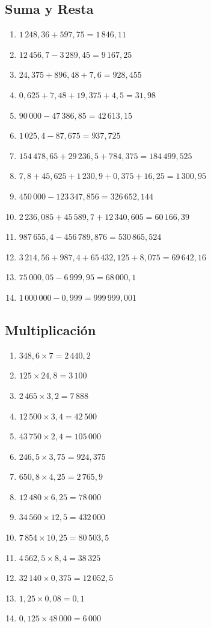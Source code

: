\documentclass[12pt, letterpaper]{article}
\begin{document}
  \subsection*{Suma y Resta}
  \begin{enumerate}[leftmargin=*, label=\textbf{\arabic*.}]
    \item $1\,248{,}36 + 597{,}75 = 1\,846{,}11$
    \item $12\,456{,}7 - 3\,289{,}45 = 9\,167{,}25$
    \item $24{,}375 + 896{,}48 + 7{,}6 = 928{,}455$
    \item $0{,}625 + 7{,}48 + 19{,}375 + 4{,}5 = 31{,}98$
    \item $90\,000 - 47\,386{,}85 = 42\,613{,}15$
    \item $1\,025{,}4 - 87{,}675 = 937{,}725$
    \item $154\,478{,}65 + 29\,236{,}5 + 784{,}375 = 184\,499{,}525$
    \item $7{,}8 + 45{,}625 + 1\,230{,}9 + 0{,}375 + 16{,}25 = 1\,300{,}95$
    \item $450\,000 - 123\,347{,}856 = 326\,652{,}144$
    \item $2\,236{,}085 + 45\,589{,}7 + 12\,340{,}605 = 60\,166{,}39$
    \item $987\,655{,}4 - 456\,789{,}876 = 530\,865{,}524$
    \item $3\,214{,}56 + 987{,}4 + 65\,432{,}125 + 8{,}075 = 69\,642{,}16$
    \item $75\,000{,}05 - 6\,999{,}95 = 68\,000{,}1$
    \item $1\,000\,000 - 0{,}999 = 999\,999{,}001$
  \end{enumerate}

  \subsection*{Multiplicación}
  \begin{enumerate}[leftmargin=*, label=\textbf{\arabic*.}]
    \item $348{,}6 \times 7 = 2\,440{,}2$
    \item $125 \times 24{,}8 = 3\,100$
    \item $2\,465 \times 3{,}2 = 7\,888$
    \item $12\,500 \times 3{,}4 = 42\,500$
    \item $43\,750 \times 2{,}4 = 105\,000$
    \item $246{,}5 \times 3{,}75 = 924{,}375$
    \item $650{,}8 \times 4{,}25 = 2\,765{,}9$
    \item $12\,480 \times 6{,}25 = 78\,000$
    \item $34\,560 \times 12{,}5 = 432\,000$
    \item $7\,854 \times 10{,}25 = 80\,503{,}5$
    \item $4\,562{,}5 \times 8{,}4 = 38\,325$
    \item $32\,140 \times 0{,}375 = 12\,052{,}5$
    \item $1{,}25 \times 0{,}08 = 0{,}1$
    \item $0{,}125 \times 48\,000 = 6\,000$
  \end{enumerate}
\end{document}
